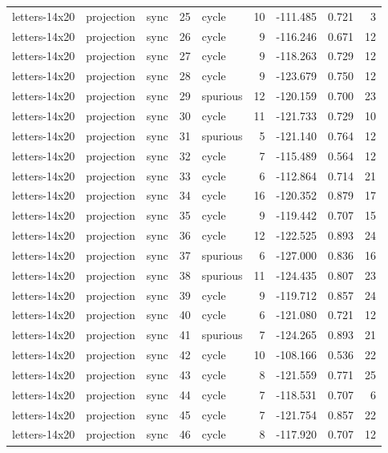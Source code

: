 \begin{tabular}{lllrlrrrr}
letters-14x20 & projection & sync & 25 & cycle & 10 & -111.485 & 0.721 & 3 \\
letters-14x20 & projection & sync & 26 & cycle & 9 & -116.246 & 0.671 & 12 \\
letters-14x20 & projection & sync & 27 & cycle & 9 & -118.263 & 0.729 & 12 \\
letters-14x20 & projection & sync & 28 & cycle & 9 & -123.679 & 0.750 & 12 \\
letters-14x20 & projection & sync & 29 & spurious & 12 & -120.159 & 0.700 & 23 \\
letters-14x20 & projection & sync & 30 & cycle & 11 & -121.733 & 0.729 & 10 \\
letters-14x20 & projection & sync & 31 & spurious & 5 & -121.140 & 0.764 & 12 \\
letters-14x20 & projection & sync & 32 & cycle & 7 & -115.489 & 0.564 & 12 \\
letters-14x20 & projection & sync & 33 & cycle & 6 & -112.864 & 0.714 & 21 \\
letters-14x20 & projection & sync & 34 & cycle & 16 & -120.352 & 0.879 & 17 \\
letters-14x20 & projection & sync & 35 & cycle & 9 & -119.442 & 0.707 & 15 \\
letters-14x20 & projection & sync & 36 & cycle & 12 & -122.525 & 0.893 & 24 \\
letters-14x20 & projection & sync & 37 & spurious & 6 & -127.000 & 0.836 & 16 \\
letters-14x20 & projection & sync & 38 & spurious & 11 & -124.435 & 0.807 & 23 \\
letters-14x20 & projection & sync & 39 & cycle & 9 & -119.712 & 0.857 & 24 \\
letters-14x20 & projection & sync & 40 & cycle & 6 & -121.080 & 0.721 & 12 \\
letters-14x20 & projection & sync & 41 & spurious & 7 & -124.265 & 0.893 & 21 \\
letters-14x20 & projection & sync & 42 & cycle & 10 & -108.166 & 0.536 & 22 \\
letters-14x20 & projection & sync & 43 & cycle & 8 & -121.559 & 0.771 & 25 \\
letters-14x20 & projection & sync & 44 & cycle & 7 & -118.531 & 0.707 & 6 \\
letters-14x20 & projection & sync & 45 & cycle & 7 & -121.754 & 0.857 & 22 \\
letters-14x20 & projection & sync & 46 & cycle & 8 & -117.920 & 0.707 & 12 \\

\end{tabular}
